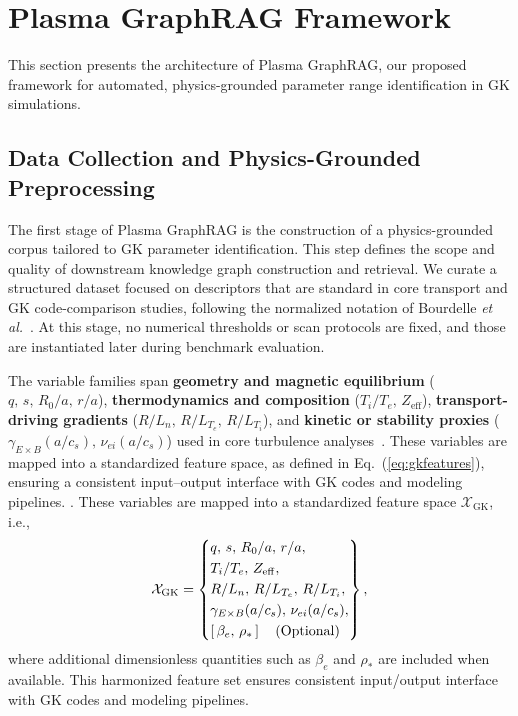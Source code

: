 \documentclass[journal]{IEEEtran}
\begin{document}
\section{Plasma GraphRAG Framework}
This section presents the architecture of Plasma GraphRAG, our proposed framework for automated, physics-grounded parameter range identification in GK simulations. 



\subsection{Data Collection and Physics-Grounded Preprocessing}
The first stage of Plasma GraphRAG is the construction of a physics-grounded corpus tailored to GK parameter identification. This step defines the scope and quality of downstream knowledge graph construction and retrieval. We curate a structured dataset focused on descriptors that are standard in core transport and GK code-comparison studies, following the normalized notation of Bourdelle \emph{et al.}~\cite{bourdelle2015core}. At this stage, no numerical thresholds or scan protocols are fixed, and those are instantiated later during benchmark evaluation.

{The variable families span \textbf{geometry and magnetic equilibrium} 
(\( q,\, s,\, R_0/a,\, r/a \)), 
\textbf{thermodynamics and composition} 
(\( T_i/T_e,\, Z_{\mathrm{eff}} \)), 
\textbf{transport-driving gradients} 
(\( R/L_n,\, R/L_{T_e},\, R/L_{T_i} \)), 
and \textbf{kinetic or stability proxies} 
(\( \gamma_{E{\times}B}(a/c_s),\, \nu_{ei}(a/c_s) \)) 
used in core turbulence analyses~\cite{rodriguez2022nonlinear}. 
These variables are mapped into a standardized feature space, as defined in Eq.~(\ref{eq:gkfeatures}), 
ensuring a consistent input--output interface with GK codes and modeling pipelines.} \cite{rodriguez2022nonlinear}. These variables are mapped into a standardized feature space ${\mathcal{X}_{\mathrm{GK}}}$, i.e.,
\begin{equation}
\mathcal{X}_{\mathrm{GK}} =
\left\{
\begin{aligned}
 & q,\, s,\, R_0/a,\, r/a,\\
 & T_i/T_e,\, Z_{\mathrm{eff}}, \\
 & R/L_n,\, R/L_{T_e},\, R/L_{T_i},\\
 & \gamma_{E{\times}B}(a/c_s),\, \nu_{ei}(a/c_s),\\
 & [\,\beta_e,\, \rho_\ast\,]\,\,\,\,\,\,\,(\rm{Optional})
\end{aligned}
\right\},
\label{eq:gkfeatures}
\end{equation}
where additional dimensionless quantities such as $\beta_e$ and $\rho_\ast$ are included when available. This harmonized feature set ensures consistent input/output interface with GK codes and modeling pipelines.
\end{document}
